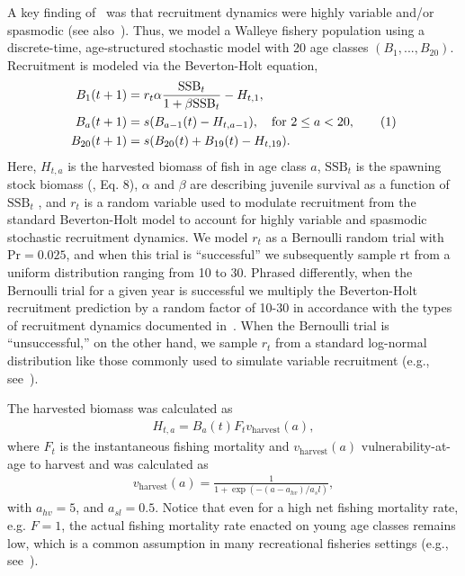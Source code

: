 \documentclass[floatfix,nofootinbib,longbibliography,notitlepage]{revtex4-1}
\newcommand\numberthis{\addtocounter{equation}{1}\tag{\theequation}}
\def\vharv{v_{\text{harvest}}}
\def\ssb{\text{SSB}}
\begin{document}
A key finding of~\cite{cahill2022} was that recruitment dynamics were highly variable and/or spasmodic (see also~\cite{caddy-gulland}). 
Thus, we model a Walleye fishery population using a discrete-time, age-structured stochastic model with 20 age classes $(B_1, ... ,B_{20})$. 
Recruitment is modeled via the Beverton-Holt equation,
\begin{align*}
    B_1(t+1) &= r_t \alpha \frac{\ssb_t}{1 + \beta \ssb_t} - H_{t,1},\\
    B_a(t+1) &= s (B_{a-1}(t) - H_{t,a-1}), \quad \text{for } 2 \leq a < 20, \numberthis\\
    B_{20}(t+1) &= s (B_{20}(t) + B_{19}(t) - H_{t,19}).
\end{align*}
Here, $H_{t,a}$ is the harvested biomass of fish in age class $a$, $\ssb_t$ is the spawning stock biomass (\cite{cahill2022}, Eq. 8), $\alpha$ and $\beta$ are describing juvenile survival as a function of $\ssb_t$ , and $r_t$ is a random variable used to modulate recruitment from the standard Beverton-Holt model to account for highly variable and spasmodic stochastic recruitment dynamics. 
We model $r_t$ as a Bernoulli random trial with $\text{Pr}=0.025$, and when this trial is “successful” we subsequently sample rt from a uniform distribution ranging from 10 to 30. 
Phrased differently, when the Bernoulli trial for a given year is successful we multiply the Beverton-Holt recruitment prediction by a random factor of 10-30 in accordance with the types of recruitment dynamics documented in~\cite{cahill2022}. 
When the Bernoulli trial is “unsuccessful,” on the other hand, we sample $r_t$ from a standard log-normal distribution like those commonly used to simulate variable recruitment (e.g., see~\cite{quinn-deriso}).

The harvested biomass was calculated as
\begin{align*}
    H_{t,a} = B_a(t) F_t \vharv(a),
\end{align*}
where $F_t$ is the instantaneous  fishing mortality and $\vharv(a)$ vulnerability-at-age to harvest and was calculated as
\begin{align}
    \vharv(a) = \frac1{1 + \exp(-(a-a_{hv})/a_sl)},
\end{align}
with $a_{hv}=5$, and $a_{sl}=0.5$. 
Notice that even for a high net fishing mortality rate, e.g. $F=1$, the actual fishing mortality rate enacted on young age classes remains low, which is a common assumption in many recreational fisheries settings (e.g., see~\cite{golden2022focusing}).
\end{document}
